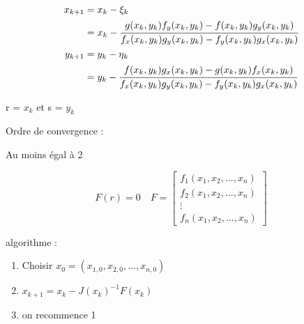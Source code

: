 
\begin{align*}
x_{k+1} &= x_k - \xi_k \\
&= x_k - \cfrac{g(x_k, y_k)f_y(x_k, y_k) - f(x_k, y_k)g_y(x_k, y_k)}{f_x(x_k, y_k)g_y(x_k, y_k) - f_y(x_k, y_k)g_x(x_k, y_k)}\\
y_{k+1} &= y_k - \eta_k \\
&= y_k - \cfrac{f(x_k, y_k)g_x(x_k, y_k) - g(x_k, y_k)f_x(x_k, y_k)}{f_x(x_k, y_k)g_y(x_k, y_k) - f_y(x_k, y_k)g_x(x_k, y_k)}\\
\end{align*}

r = $x_k$ et s = $y_k$

Ordre de convergence :

Au moins égal à 2


\[F(r) = 0 \quad F = \begin{bmatrix}
    f_1(x_1, x_2, ..., x_n)\\
    f_2(x_1, x_2, ..., x_n)\\
    \vdots \\
    f_n(x_1, x_2, ..., x_n)
\end{bmatrix}
\]

algorithme :

\begin{enumerate}
    \item Choisir $x_0 = (x_{1,0}, x_{2,0}, ..., x_{n,0})$
    \item $x_{k+1} = x_k - J(x_k)^{-1} F(x_k)$
    \item on recommence 1
\end{enumerate}


